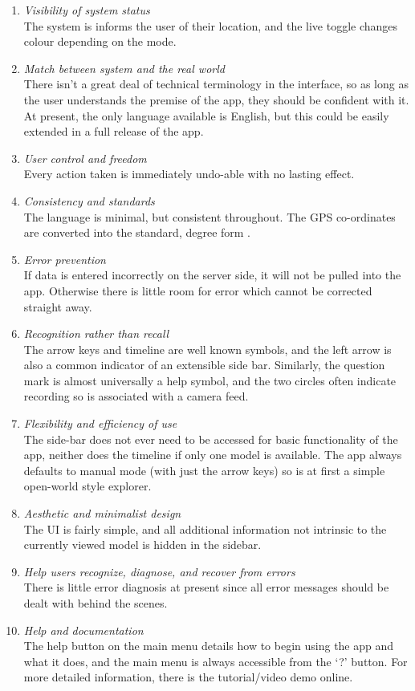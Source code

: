 \documentclass[12pt, a4paper]{article}
\begin{document}
\begin{enumerate}
    \item \textit{Visibility of system status} \\
    The system is informs the user of their location, and the live toggle changes colour depending on the mode.
    
    \item \textit{Match between system and the real world} \\
    There isn't a great deal of technical terminology in the interface, so as long as the user understands the premise of the app, they should be confident with it. At present, the only language available is English, but this could be easily extended in a full release of the app. 
    \item \textit{User control and freedom} \\
    Every action taken is immediately undo-able with no lasting effect.
    \item \textit{Consistency and standards} \\
    The language is minimal, but consistent throughout. The GPS co-ordinates are converted into the standard, degree form .
    \item \textit{Error prevention} \\
    If data is entered incorrectly on the server side, it will not be pulled into the app. Otherwise there is little room for error which cannot be corrected straight away.
    \item \textit{Recognition rather than recall} \\
    The arrow keys and timeline are well known symbols, and the left arrow is also a common indicator of an extensible side bar. Similarly, the question mark is almost universally a help symbol, and the two circles often indicate recording so is associated with a camera feed.
    \item \textit{Flexibility and efficiency of use} \\
    The side-bar does not ever need to be accessed for basic functionality of the app, neither does the timeline if only one model is available. The app always defaults to manual mode (with just the arrow keys) so is at first a simple open-world style explorer.
    \item \textit{Aesthetic and minimalist design} \\
    The UI is fairly simple, and all additional information not intrinsic to the currently viewed model is hidden in the sidebar.
    \item \textit{Help users recognize, diagnose, and recover from errors} \\
    There is little error diagnosis at present since all error messages should be dealt with behind the scenes.
    \item \textit{Help and documentation} \\
    The help button on the main menu details how to begin using the app and what it does, and the main menu is always accessible from the `?' button. For more detailed information, there is the tutorial/video demo online. \cite{design:videodemo}
\end{enumerate}
\end{document}
